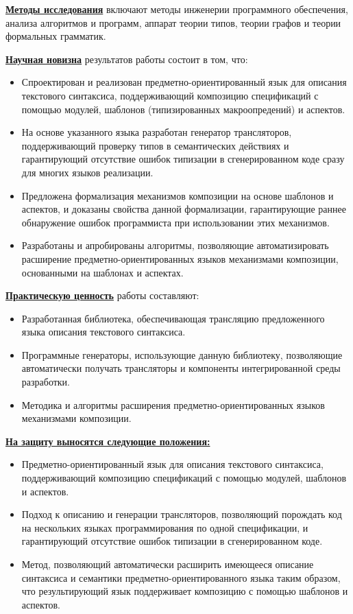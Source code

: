 \documentclass[12pt,a4paper]{article}
\theoremstyle{definition}
\theoremstyle{plain}
\newcommand{\afsubsection}[1]{\par \textbf{\underline{#1}}}
\begin{document}
\afsubsection{Методы исследования} включают методы инженерии программного обеспечения, анализа алгоритмов и программ, аппарат теории типов, теории графов и теории формальных грамматик.

\afsubsection{Научная новизна} результатов работы состоит в том, что:
\begin{itemize}
\item Спроектирован и реализован предметно-ориентированный язык для описания текстового синтаксиса, поддерживающий композицию спецификаций с помощью модулей, шаблонов (типизированных макроопредений) и аспектов.
\item На основе указанного языка разработан генератор трансляторов, поддерживающий проверку типов в семантических действиях и гарантирующий отсутствие ошибок типизации в сгенерированном коде сразу для многих языков реализации.
\item Предложена формализация механизмов композиции на основе шаблонов и аспектов, и доказаны свойства данной формализации, гарантирующие раннее обнаружение ошибок программиста при использовании этих механизмов.
\item Разработаны и апробированы алгоритмы, позволяющие автоматизировать расширение предметно-ориентированных языков механизмами композиции, основанными на шаблонах и аспектах.
\end{itemize}

\afsubsection{Практическую ценность} работы составляют:
\begin{itemize}
\item Разработанная библиотека, обеспечивающая трансляцию предложенного языка описания текстового синтаксиса.
\item Программные генераторы, использующие данную библиотеку, позволяющие автоматически получать трансляторы и компоненты интегрированной среды разработки.
\item Методика и алгоритмы расширения предметно-ориентированных языков механизмами композиции.
\end{itemize}

\afsubsection{На защиту выносятся следующие положения:} 
\begin{itemize}
\item Предметно-ориентированный язык для описания текстового синтаксиса, поддерживающий композицию спецификаций с помощью модулей, шаблонов и аспектов.
\item Подход к описанию и генерации трансляторов, позволяющий порождать код на нескольких языках программирования по одной спецификации, и гарантирующий отсутствие ошибок типизации в сгенерированном коде.
\item Метод, позволяющий автоматически расширить имеющееся описание синтаксиса и семантики предметно-ориентированного языка таким образом, что результирующий язык поддерживает композицию с помощью шаблонов и аспектов.
\end{itemize}
\end{document}

